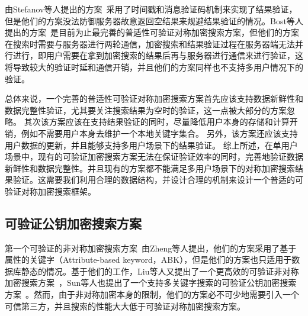 由Stefanov等人提出的方案~\cite{stefanov2014practical}采用了时间戳和消息验证码机制来实现了结果验证，但是他们的方案没法防御服务器故意返回空结果来规避结果验证的情况。Bost等人提出的方案~\cite{bost2016verifiable}是目前为止最完善的普适性可验证对称加密搜索方案，但他们的方案在搜索时需要与服务器进行两轮通信，加密搜索和结果验证过程在服务器端无法并行进行，即用户需要在拿到加密搜索的结果后再与服务器进行通信来进行验证，这将导致较大的验证时延和通信开销，并且他们的方案同样也不支持多用户情况下的验证。

总体来说，一个完善的普适性可验证对称加密搜索方案首先应该支持数据新鲜性和数据完整性验证，尤其要关注搜索结果为空时的验证，这一点被大部分的方案忽略。
其次该方案应该在支持结果验证的同时，尽量降低用户本身的存储和计算开销，例如不需要用户本身去维护一个本地关键字集合。
另外，该方案还应该支持用户数据的更新，并且能够支持多用户场景下的结果验证。
综上所述，在单用户场景中，现有的可验证加密搜索方案无法在保证验证效率的同时，完善地验证数据新鲜性和数据完整性。并且现有的方案都不能满足多用户场景下的对称加密搜索结果验证。这需要我们利用合理的数据结构，并设计合理的机制来设计一个普适的可验证对称加密搜索框架。

\subsection{可验证公钥加密搜索方案}
第一个可验证的非对称加密搜索方案~\cite{zheng2014vabks}由Zheng等人提出，他们的方案采用了基于属性的关键字（Attribute-based keyword，ABK），但是他们的方案也只适用于数据库静态的情况。基于他们的工作，Liu等人又提出了一个更高效的可验证非对称加密搜索方案~\cite{liu2014efficient}，Sun等人也提出了一个支持多关键字搜索的可验证公钥加密搜索方案~\cite{sun2015catch}。然而，由于非对称加密本身的限制，他们的方案必不可少地需要引入一个可信第三方，并且搜索的性能大大低于可验证对称加密搜索方案。

